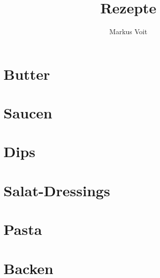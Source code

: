 \documentclass[
  DIV=11,%
  pagesize,%
  fontsize=11pt,%
  paper=a4,%
  numbers=noenddot,
]{scrartcl}
\title{Rezepte}
\author{Markus Voit}
\begin{document}
\maketitle
\clearpage
\tableofcontents
\clearpage

\section{Butter}
\newpage
\newpage
\newpage
\newpage

\section{Saucen}
\newpage
\newpage
\newpage
\newpage

\section{Dips}
\newpage

\section{Salat-Dressings}
\newpage

\section{Pasta}
\newpage
\newpage

\section{Backen}
\newpage
\end{document}
